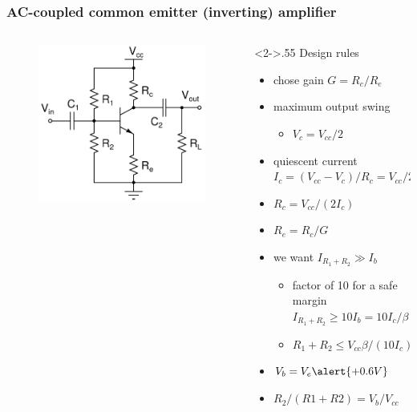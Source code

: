 \documentclass[beamer]{standalone}
\begin{document}
\frame
{ \frametitle{AC-coupled common emitter (inverting) amplifier}
\begin{columns}[c]
 \begin{column}{.45\textwidth}
  \begin{figure}
   \includegraphics[height=0.50\textheight]{./schematics/npn_ac_common_emitter_amplifier}
  \end{figure}
 \end{column}
 \begin{column}<2->{.55\textwidth}
  Design rules
  \begin{itemize}
   \item chose gain $G=R_c/R_e$
   \item maximum output swing 
    \begin{itemize}
     \item $V_c=V_{cc} /2 $
    \end{itemize}
   \item quiescent current
    $I_c=(V_{cc}-V_c)/R_c= V_{cc}/2R_c$
   \item $R_c=V_{cc}/(2 I_c)$
   \item $R_e=R_c/G$ 
   \item we want $I_{R_1+R_2} \gg I_b$
    \begin{itemize}
     \item factor of 10 for a safe margin
      $I_{R_1+R_2} \ge 10 I_b = 10 I_c / \beta$
     \item
      $R_1+R_2 \le V_{cc} \beta /(10 I_c)$
    \end{itemize}
   \item $V_b=V_e \alert{+0.6 V}$
   \item  $R_2 /(R1+R2) = V_b/V_{cc}$
  \end{itemize}
 \end{column}
\end{columns}
 
 }
\end{document}

